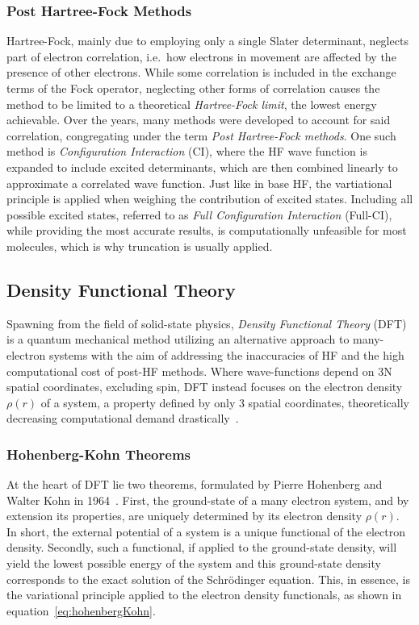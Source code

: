 \documentclass[12pt]{article}
\begin{document}
\subsubsection{Post Hartree-Fock Methods}
Hartree-Fock, mainly due to employing only a single Slater determinant, neglects part of electron correlation, i.e.~how electrons in movement are affected by the presence of other electrons.
While some correlation is included in the exchange terms of the Fock operator, neglecting other forms of correlation causes the method to be limited to a theoretical \textit{Hartree-Fock limit}, the lowest energy achievable.
Over the years, many methods were developed to account for said correlation, congregating under the term \textit{Post Hartree-Fock methods}.
One such method is \textit{Configuration Interaction} (CI), where the HF wave function is expanded to include excited determinants, which are then combined linearly to approximate a correlated wave function. Just like in base HF, the vartiational principle is applied when weighing the contribution of excited states.
Including all possible excited states, referred to as \textit{Full Configuration Interaction} (Full-CI), while providing the most accurate results, is computationally unfeasible for most molecules, which is why truncation is usually applied.

\subsection{Density Functional Theory}
Spawning from the field of solid-state physics, \textit{Density Functional Theory} (DFT) is a quantum mechanical method utilizing an alternative approach to many-electron systems with the aim of addressing the inaccuracies of HF and the high computational cost of post-HF methods.
Where wave-functions depend on 3N spatial coordinates, excluding spin, DFT instead focuses on the electron density $\rho(r)$ of a system, a property defined by only 3 spatial coordinates, theoretically decreasing computational demand drastically~\cite{Orio2009}.

\subsubsection{Hohenberg-Kohn Theorems}
At the heart of DFT lie two theorems, formulated by Pierre Hohenberg and Walter Kohn in 1964~\cite{Hohenberg1964}.
First, the ground-state of a many electron system, and by extension its properties, are uniquely determined by its electron density $\rho(r)$. In short, the external potential of a system is a unique functional of the electron density.
Secondly, such a functional, if applied to the ground-state density, will yield the lowest possible energy of the system and this ground-state density corresponds to the exact solution of the Schrödinger equation. 
This, in essence, is the variational principle applied to the electron density functionals, as shown in equation~\ref{eq:hohenbergKohn}.
\end{document}
